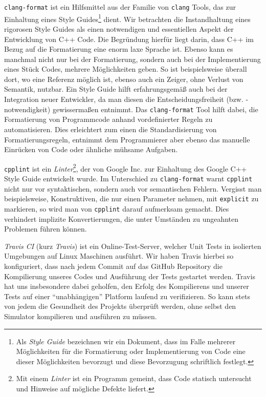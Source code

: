 \begin{sitemize}{-0.3cm}
  \item \texttt{clang-format} ist ein Hilfsmittel aus der Familie von
  \texttt{clang} Tools, das zur Einhaltung eines Style Guides\footnote{Als
  \emph{Style Guide} bezeichnen wir ein Dokument, dass im Falle mehrerer
  Möglichkeiten für die Formatierung oder Implementierung von Code eine dieser
  Möglichkeiten bevorzugt und diese Bevorzugung schriftlich festlegt.} dient.
  Wir betrachten die Instandhaltung eines rigorosen Style Guides als einen
  notwendigen und essentiellen Aspekt der Entwicklung von C++ Code. Die
  Begründung hierfür liegt darin, dass C++ im Bezug auf die Formatierung eine
  enorm laxe Sprache ist. Ebenso kann es manchmal nicht nur bei der
  Formatierung, sondern auch bei der Implementierung eines Stück Codes, mehrere
  Möglichkeiten geben. So ist beispielsweise überall dort, wo eine Referenz
  möglich ist, ebenso auch ein Zeiger, ohne Verlust von Semantik, nutzbar. Ein
  Style Guide hilft erfahrungsgemäß auch bei der Integration neuer Entwickler,
  da man diesen die Entscheidungsfreiheit (bzw. -notwendigkeit) gewissermaßen
  entnimmt. Das \texttt{clang-format} Tool hilft dabei, die Formatierung von
  Programmcode anhand vordefinierter Regeln zu automatisieren. Dies erleichtert
  zum einen die Standardisierung von Formatierungsregeln, entnimmt dem
  Programmierer aber ebenso das manuelle Einrücken von Code oder ähnliche
  mühsame Aufgaben.
  \item \texttt{cpplint} ist ein \emph{Linter}\footnote{Mit einem \emph{Linter}
  ist ein Programm gemeint, dass Code statisch untersucht und Hinweise auf
  mögliche Defekte liefert.}, der von Google Inc. zur Einhaltung des Google C++
  Style Guide entwickelt wurde. Im Unterschied zu \texttt{clang-format} warnt
  \texttt{cpplint} nicht nur vor syntaktischen, sondern auch vor semantischen
  Fehlern. Vergisst man beispielsweise, Konstruktiven, die nur einen Parameter
  nehmen, mit \texttt{explicit} zu markieren, so wird man von \texttt{cpplint}
  darauf aufmerksam gemacht. Dies verhindert implizite Konvertierungen, die
  unter Umständen zu ungeahnten Problemen führen können.
  \item \emph{Travis CI} (kurz \emph{Travis}) ist ein Online-Test-Server,
  welcher Unit Tests in isolierten Umgebungen auf Linux Maschinen ausführt. Wir
  haben Travis hierbei so konfiguriert, dass nach jedem Commit auf das GitHub
  Repository die Kompilierung unseres Codes und Ausführung der Tests gestartet
  werden. Travis hat uns insbesondere dabei geholfen, den Erfolg des
  Kompilierens und unserer Tests auf einer ``unabhängigen'' Platform laufend zu
  verifizieren. So kann stets von jedem die Gesundheit des Projekts überprüft
  werden, ohne selbst den Simulator kompilieren und ausführen zu müssen.
\end{sitemize}

